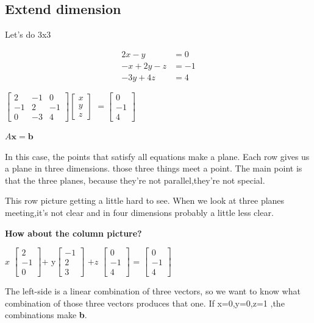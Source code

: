 \documentclass{article}
\begin{document}
\subsection{Extend dimension}
Let's do 3x3

\begin{align*} 
2x - y &=  0 \\ 
-x + 2y -z&=  -1\\
-3y+4z &=4
\end{align*}
\begin{center}
$\begin{bmatrix}
2 & -1 & 0\\
-1 & 2 & -1 \\
0 & -3 & 4
\end{bmatrix}
\begin{bmatrix}
x\\
y\\
z
\end{bmatrix}$
$=
\begin{bmatrix}
0\\
-1\\
4
\end{bmatrix}$  

$A\textbf{x}=\textbf{b}$
\end{center}

In this case, the points that satisfy all equations make a plane. Each row gives us a plane in three dimensions. those three things meet a point. The main point is that the three planes, because they're not parallel,they're not special. 

This row picture getting a little hard to see. When we look at three planes meeting,it's not clear and in four dimensions probably a little less clear.

\textbf{How about the column picture?}

\begin{center}
$x$
$\begin{bmatrix}
2  \\
-1  \\
0
\end{bmatrix}
$+ y$
\begin{bmatrix}
-1\\
2 \\
3
\end{bmatrix}$
$+ z$
$\begin{bmatrix}
0\\
-1 \\
4
\end{bmatrix}$
=
$\begin{bmatrix}
0\\
-1\\
4
\end{bmatrix}$

\end{center}
The left-side is a linear combination of three vectors, so we want to know what combination of those three vectors produces that one. If x=0,y=0,z=1 ,the combinations make \textbf{b}.
\end{document}

